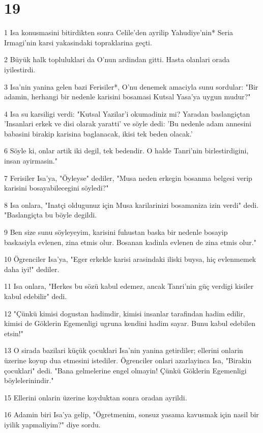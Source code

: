 \chapter{19}

\par 1 Isa konusmasini bitirdikten sonra Celile'den ayrilip Yahudiye'nin* Seria Irmagi'nin karsi yakasindaki topraklarina geçti.
\par 2 Büyük halk topluluklari da O'nun ardindan gitti. Hasta olanlari orada iyilestirdi.
\par 3 Isa'nin yanina gelen bazi Ferisiler*, O'nu denemek amaciyla sunu sordular: "Bir adamin, herhangi bir nedenle karisini bosamasi Kutsal Yasa'ya uygun mudur?"
\par 4 Isa su karsiligi verdi: "Kutsal Yazilar'i okumadiniz mi? Yaradan baslangiçtan 'Insanlari erkek ve disi olarak yaratti' ve söyle dedi: 'Bu nedenle adam annesini babasini birakip karisina baglanacak, ikisi tek beden olacak.'
\par 6 Söyle ki, onlar artik iki degil, tek bedendir. O halde Tanri'nin birlestirdigini, insan ayirmasin."
\par 7 Ferisiler Isa'ya, "Öyleyse" dediler, "Musa neden erkegin bosanma belgesi verip karisini bosayabilecegini söyledi?"
\par 8 Isa onlara, "Inatçi oldugunuz için Musa karilarinizi bosamaniza izin verdi" dedi. "Baslangiçta bu böyle degildi.
\par 9 Ben size sunu söyleyeyim, karisini fuhustan baska bir nedenle bosayip baskasiyla evlenen, zina etmis olur. Bosanan kadinla evlenen de zina etmis olur."
\par 10 Ögrenciler Isa'ya, "Eger erkekle karisi arasindaki iliski buysa, hiç evlenmemek daha iyi!" dediler.
\par 11 Isa onlara, "Herkes bu sözü kabul edemez, ancak Tanri'nin güç verdigi kisiler kabul edebilir" dedi.
\par 12 "Çünkü kimisi dogustan hadimdir, kimisi insanlar tarafindan hadim edilir, kimisi de Göklerin Egemenligi ugruna kendini hadim sayar. Bunu kabul edebilen etsin!"
\par 13 O sirada bazilari küçük çocuklari Isa'nin yanina getirdiler; ellerini onlarin üzerine koyup dua etmesini istediler. Ögrenciler onlari azarlayinca Isa, "Birakin çocuklari" dedi. "Bana gelmelerine engel olmayin! Çünkü Göklerin Egemenligi böylelerinindir."
\par 15 Ellerini onlarin üzerine koyduktan sonra oradan ayrildi.
\par 16 Adamin biri Isa'ya gelip, "Ögretmenim, sonsuz yasama kavusmak için nasil bir iyilik yapmaliyim?" diye sordu.
